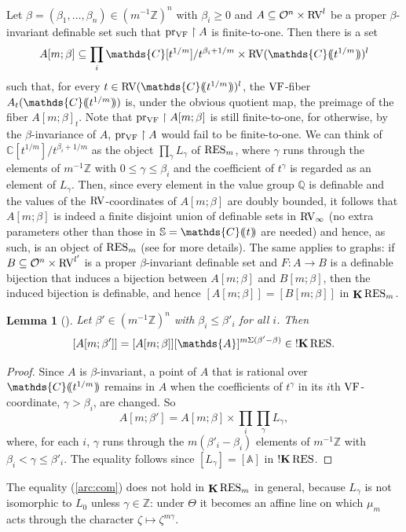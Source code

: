 \documentclass[12pt]{amsart}
\theoremstyle{plain}
\newtheorem{lem}[thm]{Lemma}
\theoremstyle{definition}
\theoremstyle{remark}
\numberwithin{equation}{section}
\theoremstyle{plain}
\newcommand{\VF}{\textup{VF}}
\newcommand{\RV}{\textup{RV}}
\newcommand{\OO}{\mdl O}
\newcommand{\Z}{\mathds{Z}}
\newcommand{\A}{\mathds{A}}
\newcommand{\C}{\mathds{C}}
\newcommand{\Q}{\mathds{Q}}
\newcommand{\0}{\emptyset}
\newcommand{\dpar}[1]{%
   (\mkern-4mu (#1 )\mkern-4mu )}
\newcommand{\mdl}[1]{\mathcal{#1}}  %
\newcommand{\rest}{\upharpoonright}
\newcommand{\fun}{\longrightarrow}
\newcommand{\efun}{\longmapsto}
\newcommand{\sub}{\subseteq}
\newcommand{\RES}{\textup{RES}}
\DeclareMathOperator{\ggk}{\mathbf{K}}
\DeclareMathOperator{\sggk}{!\mathbf{K}}
\DeclareMathOperator{\pvf}{pr_{\VF}}
\begin{document}
Let $\beta = (\beta_1, \ldots, \beta_n) \in (m^{-1} \Z)^n$ with $\beta_i \geq 0$ and $A \sub \OO^n \times \RV^l$ be a proper $\beta$-invariant definable set such that $\pvf \rest A$ is finite-to-one. Then there is a set
\[
A[m;\beta] \sub \prod_i \C[t^{1/m}] / t^{\beta_i + 1/m} \times \RV(\C \dpar{t^{1/m}})^l
\]
such that, for every $t \in \RV(\C \dpar{t^{1/m}})^l$, the $\VF$-fiber $A_t(\C \dpar{t^{1/m}})$ is, under the obvious quotient map, the preimage of the fiber $A[m;\beta]_t$. Note that $\pvf \rest A[m;\beta]$ is still finite-to-one, for otherwise, by the $\beta$-invariance of $A$, $\pvf \rest A$ would fail to be finite-to-one. We can think of $\C[t^{1/m}] / t^{\beta_i + 1/m}$ as the object $\prod_{\gamma} L_\gamma$ of $\RES_{m}$, where $\gamma$ runs through the elements of $m^{-1}\Z$ with $0 \leq \gamma \leq \beta_i$ and the coefficient of $t^\gamma$ is regarded as an element of $L_\gamma$. Then, since every element in the value group $\Q$ is definable and the values of the $\RV$-coordinates of $A[m;\beta]$ are doubly bounded,  it follows that  $A[m;\beta]$ is indeed a finite disjoint union of definable sets in $\RV_\infty$ (no extra parameters other than those in $\mathbb{S} = \C \dpar{ t }$ are needed) and hence, as such, is an object of $\RES_{m}$ (see \cite[\S~4.2]{hru:loe:lef} for more details). The same applies to graphs: if $B \sub \OO^n \times \RV^{l'}$ is a proper $\beta$-invariant definable set and $F : A \fun B$ is a definable bijection that induces a bijection between $A[m;\beta]$ and $B[m;\beta]$, then the induced bijection is definable, and hence $[A[m;\beta]] = [B[m;\beta]]$ in $\ggk \RES_m$.


\begin{lem}[{\cite[Lemma~4.2.1]{hru:loe:lef}}]
Let $\beta' \in (m^{-1} \Z)^n$ with $\beta_i \leq \beta'_i$ for all $i$. Then
\begin{equation}\label{arc:com}
  [A[m;\beta']] = [A[m;\beta]][\A]^{m \Sigma (\beta' - \beta)} \in \sggk \RES.
\end{equation}
\end{lem}
\begin{proof}
Since $A$ is $\beta$-invariant, a point of $A$ that is rational over $\C \dpar{t^{1/m}}$ remains in $A$ when the coefficients of $t^\gamma$ in its $i$th $\VF$-coordinate, $\gamma > \beta_i$, are changed. So
\[
A[m;\beta'] = A[m;\beta] \times \prod_i \prod_{\gamma} L_\gamma,
\]
where, for each $i$, $\gamma$ runs through the $m(\beta'_i - \beta_i)$ elements of $m^{-1}\Z$ with $\beta_i < \gamma \leq \beta'_i$. The equality follows since $[L_\gamma] = [\A]$ in $\sggk \RES$.
\end{proof}
The equality (\ref{arc:com}) does not hold in $\ggk \RES_{m}$ in general, because $L_\gamma$ is not isomorphic to $L_0$ unless $\gamma \in \Z$: under $\Theta$ it becomes an affine line on which $\mu_m$ acts through the character $\zeta \efun \zeta^{m\gamma}$.
\end{document}
